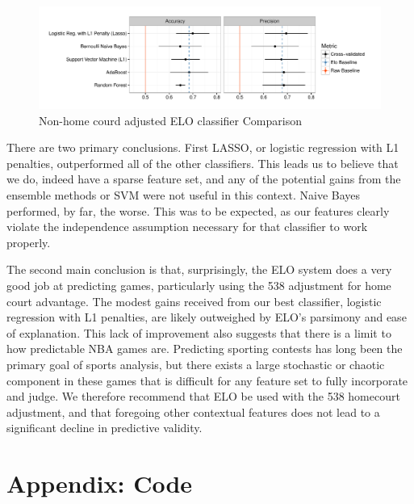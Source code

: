 \documentclass[12pt]{article}
\begin{document}
\begin{figure}
\caption{Non-home courd adjusted ELO classifier Comparison}
\includegraphics[]{01b-no-hc-classifier-comparison.pdf}
\end{figure}

There are two primary conclusions. First LASSO, or logistic regression with L1 penalties, outperformed all of the other classifiers. This leads us to believe that we do, indeed have a sparse feature set, and any of the potential gains from the ensemble methods or SVM were not useful in this context. Naive Bayes performed, by far, the worse. This was to be expected, as our features clearly violate the independence assumption necessary for that classifier to work properly.

The second main conclusion is that, surprisingly, the ELO system does a very good job at predicting games, particularly using the 538 adjustment for home court advantage. The modest gains received from our best classifier, logistic regression with L1 penalties, are likely outweighed by ELO's parsimony and ease of explanation. This lack of improvement also suggests that there is a limit to how predictable NBA games are. Predicting sporting contests has long been the primary goal of sports analysis, but there exists a large stochastic or chaotic component in these games that is difficult for any feature set to fully incorporate and judge. We therefore recommend that ELO be used with the 538 homecourt adjustment, and that foregoing other contextual features does not lead to a significant decline in predictive validity.

\section*{Appendix: Code}
\end{document}
